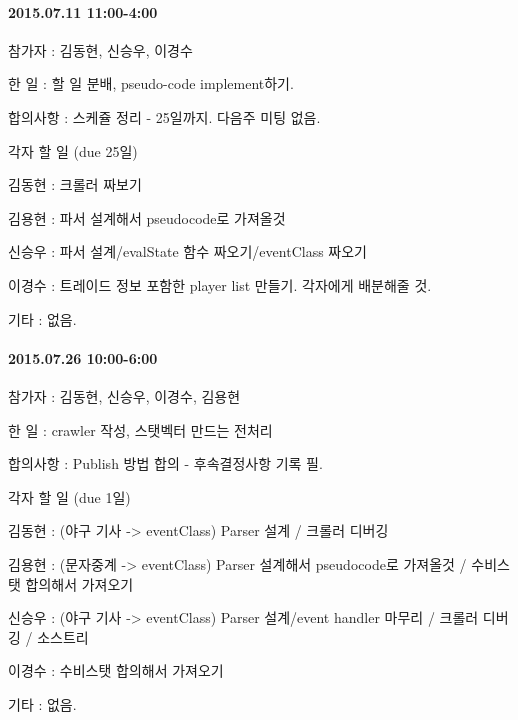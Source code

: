 \documentclass[twoside]{article}
\begin{document}
\paragraph{\textbf{2015.07.11 11:00-4:00}}
\begin{compactitem}
\item 참가자 : 김동현, 신승우, 이경수
\item 한 일 : 할 일 분배, pseudo-code implement하기. 
\item 합의사항 : 스케쥴 정리 - 25일까지. 다음주 미팅 없음.  
\item 각자 할 일 (due 25일)
\begin{compactitem}
\item 김동현 : 크롤러 짜보기 
\item 김용현 : 파서 설계해서 pseudocode로 가져올것 
\item 신승우 : 파서 설계/evalState 함수 짜오기/eventClass 짜오기
\item 이경수 : 트레이드 정보 포함한 player list 만들기. 각자에게 배분해줄 것. 
\end{compactitem}
\item 기타 :  없음. 
\end{compactitem}


\paragraph{\textbf{2015.07.26 10:00-6:00}}
\begin{compactitem}
\item 참가자 : 김동현, 신승우, 이경수, 김용현
\item 한 일 : crawler 작성, 스탯벡터 만드는 전처리 
\item 합의사항 : Publish 방법 합의 - 후속결정사항 기록 필. 
\item 각자 할 일 (due 1일)
\begin{compactitem}
\item 김동현 : (야구 기사 -> eventClass) Parser 설계 / 크롤러 디버깅
\item 김용현 : (문자중계 -> eventClass) Parser 설계해서 pseudocode로 가져올것 / 수비스탯 합의해서 가져오기  
\item 신승우 : (야구 기사 -> eventClass) Parser 설계/event handler 마무리 / 크롤러 디버깅 / 소스트리 
\item 이경수 : 수비스탯 합의해서 가져오기 
\end{compactitem}
\item 기타 :  없음. 
\end{compactitem}
\end{document}
